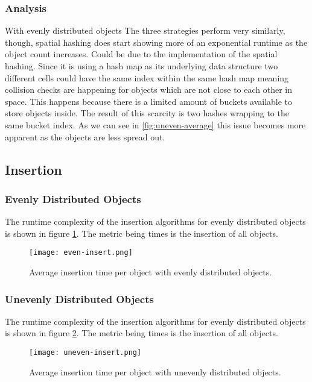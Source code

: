 \documentclass[a4paper, 12pt]{article}
\begin{document}
\subsubsection{Analysis}

With evenly distributed objects The three strategies perform very similarly,
though, spatial hashing does start showing more of an exponential runtime as the
object count increases. Could be due to the implementation of the spatial
hashing. Since it is using a hash map as its underlying data structure two
different cells could have the same index within the same hash map meaning
collision checks are happening for objects which are not close to each other in
space. This happens because there is a limited amount of buckets available to
store objects inside. The result of this scarcity is two hashes wrapping to the
same bucket index. As we can see in \ref{fig:uneven-average} this issue becomes
more apparent as the objects are less spread out.

\subsection{Insertion}

\subsubsection{Evenly Distributed Objects}
The runtime complexity of the insertion algorithms for evenly distributed
objects is shown in figure \ref{fig:even-insert}. The metric being times is the
insertion of all objects.
\begin{figure}[H]
    \centering
    \caption{Average insertion time per object with evenly distributed objects.}
    \texttt{[image: even-insert.png]}
    \label{fig:even-insert}
\end{figure}

\subsubsection{Unevenly Distributed Objects}
The runtime complexity of the insertion algorithms for evenly distributed
objects is shown in figure \ref{fig:uneven-insert}. The metric being times is
the insertion of all objects.
\begin{figure}[H]
    \centering
    \caption{Average insertion time per object with unevenly distributed
    objects.}
    \texttt{[image: uneven-insert.png]}
    \label{fig:uneven-insert}
\end{figure}
\end{document}
